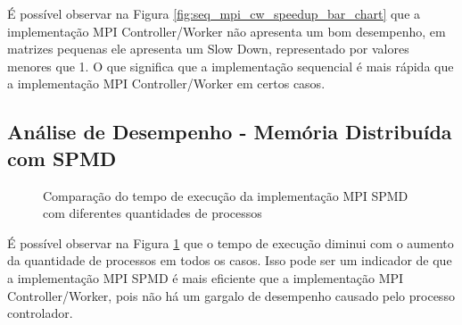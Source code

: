 \documentclass[conference]{IEEEtran}
\begin{document}
É possível observar na Figura \ref{fig:seq_mpi_cw_speedup_bar_chart} que a implementação MPI Controller/Worker não apresenta um bom desempenho, em matrizes pequenas ele apresenta um Slow Down, representado por valores menores que 1. O que significa que a implementação sequencial é mais rápida que a implementação MPI Controller/Worker em certos casos.


\subsection{Análise de Desempenho - Memória Distribuída com SPMD}

\begin{figure}[H]
    \centering
    \caption{Comparação do tempo de execução da implementação MPI SPMD com diferentes quantidades de processos}
    \label{fig:mpi_spmd_thread_line_chart}
\end{figure}

É possível observar na Figura \ref{fig:mpi_spmd_thread_line_chart} que o tempo de execução diminui com o aumento da quantidade de processos em todos os casos. Isso pode ser um indicador de que a implementação MPI SPMD é mais eficiente que a implementação MPI Controller/Worker, pois não há um gargalo de desempenho causado pelo processo controlador.
\end{document}
